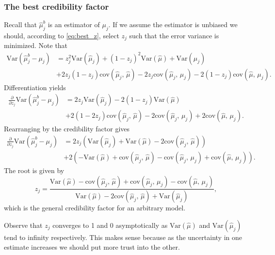 \documentclass[11pt]{article}
\theoremstyle{definition}
\begin{document}
\subsubsection{The best credibility factor}
Recall that $\hat\mu_j^b$ is an estimator of $\mu_j$. If we assume the estimator is unbiased we should, according to \eqref{eq:best_z}, select $z_j$ such that the error variance is minimized. Note that
\begin{equation}\label{eq:square_error_muj}
\begin{aligned}
    \text{Var}(\hat\mu_j^b - \mu_j) &= z_j^2\text{Var}(\hat\mu_j) + (1-z_j)^2\text{Var}(\hat\mu) + \text{Var}(\mu_j) \\
    &+ 2z_j(1-z_j)\text{cov}(\hat\mu_j,\, \hat\mu) - 2z_j\text{cov}(\hat\mu_j,\, \mu_j) - 2(1-z_j)\text{cov}(\hat\mu,\, \mu_j).
\end{aligned}
\end{equation}
Differentiation yields
\begin{equation*}
\begin{aligned}
        \frac{\partial}{\partial z_j} \text{Var}(\hat\mu_j^b - \mu_j) &= 2z_j\text{Var}(\hat\mu_j) - 2(1-z_j)\text{Var}(\hat\mu)\\ &+ 2(1-2z_j)\text{cov}(\hat\mu_j,\, \hat\mu) - 2\text{cov}(\hat\mu_j,\, \mu_j) + 2\text{cov}(\hat\mu,\, \mu_j).
\end{aligned}
\end{equation*}
Rearranging by the credibility factor gives
\begin{equation*}
    \begin{aligned}
        \frac{\partial}{\partial z_j} \text{Var}(\hat\mu_j^b - \mu_j) &= 
        2z_j\left(\text{Var}(\hat\mu_j) + \text{Var}(\hat\mu) -2\text{cov}(\hat\mu_j,\, \hat\mu)\right)\\ &+
        2\left( -\text{Var}(\hat\mu)+\text{cov}(\hat\mu_j,\, \hat\mu)-\text{cov}(\hat\mu_j,\, \mu_j)+\text{cov}(\hat\mu,\, \mu_j)\right).
    \end{aligned}
\end{equation*}
The root is given by
\begin{equation} \label{eq:z_general}
    z_j = \frac{\text{Var}(\hat\mu)-\text{cov}(\hat\mu_j,\, \hat\mu)+\text{cov}(\hat\mu_j,\, \mu_j)-\text{cov}(\hat\mu,\, \mu_j)}{\text{Var}(\hat\mu) -2\text{cov}(\hat\mu_j,\, \hat\mu) + \text{Var}(\hat\mu_j)},
\end{equation}
which is the general credibility factor for an arbitrary model.

Observe that $z_j$ converges to 1 and 0 asymptotically as $\text{Var}(\hat\mu)$ and $\text{Var}(\hat\mu_j)$ tend to infinity respectively. This makes sense because as the uncertainty in one estimate increases we should put more trust into the other.
\end{document}

